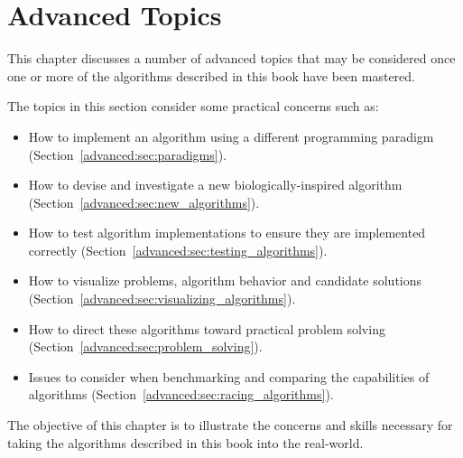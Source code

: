 

\renewcommand{\bibsection}{\subsection{\bibname}}
\chapter{Advanced Topics}
\label{ch:advanced}
This chapter discusses a number of advanced topics that may be considered once one or more of the algorithms described in this book have been mastered.

The topics in this section consider some practical concerns such as:

\begin{itemize}
  \item How to implement an algorithm using a different programming paradigm (Section~\ref{advanced:sec:paradigms}).
  \item How to devise and investigate a new biologically-inspired algorithm (Section~\ref{advanced:sec:new_algorithms}).
  \item How to test algorithm implementations to ensure they are implemented correctly (Section~\ref{advanced:sec:testing_algorithms}).
  \item How to visualize problems, algorithm behavior and candidate solutions (Section~\ref{advanced:sec:visualizing_algorithms}).
  \item How to direct these algorithms toward practical problem solving (Section~\ref{advanced:sec:problem_solving}).
  \item Issues to consider when benchmarking and comparing the capabilities of algorithms (Section~\ref{advanced:sec:racing_algorithms}).
\end{itemize}

The objective of this chapter is to illustrate the concerns and skills necessary for taking the algorithms described in this book into the real-world.

